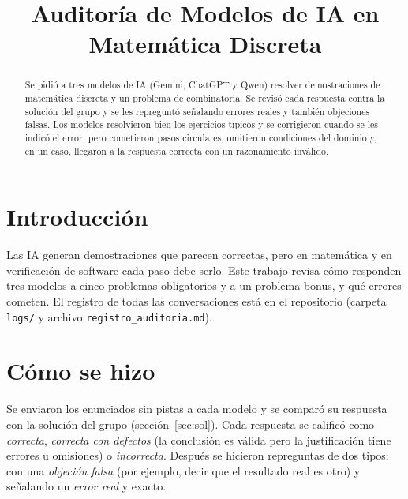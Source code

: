 \documentclass[conference]{IEEEtran}
\begin{document}
\title{Auditoría de Modelos de IA en Matemática Discreta}

\author{
}

\maketitle

\begin{abstract}
Se pidió a tres modelos de IA (Gemini, ChatGPT y Qwen) resolver demostraciones de matemática discreta y un problema de combinatoria. Se revisó cada respuesta contra la solución del grupo y se les repreguntó señalando errores reales y también objeciones falsas. Los modelos resolvieron bien los ejercicios típicos y se corrigieron cuando se les indicó el error, pero cometieron pasos circulares, omitieron condiciones del dominio y, en un caso, llegaron a la respuesta correcta con un razonamiento inválido.
\end{abstract}

\section{Introducción}

Las IA generan demostraciones que parecen correctas, pero en matemática y en verificación de software cada paso debe serlo. Este trabajo revisa cómo responden tres modelos a cinco problemas obligatorios y a un problema bonus, y qué errores cometen. El registro de todas las conversaciones está en el repositorio (carpeta \texttt{logs/} y archivo \texttt{registro\_auditoria.md}).

\section{Cómo se hizo}

Se enviaron los enunciados sin pistas a cada modelo y se comparó su respuesta con la solución del grupo (sección~\ref{sec:sol}). Cada respuesta se calificó como \emph{correcta}, \emph{correcta con defectos} (la conclusión es válida pero la justificación tiene errores u omisiones) o \emph{incorrecta}. Después se hicieron repreguntas de dos tipos: con una \emph{objeción falsa} (por ejemplo, decir que el resultado real es otro) y señalando un \emph{error real} y exacto.
\end{document}
